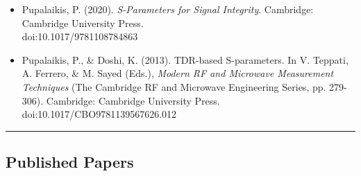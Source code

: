 \documentclass[10pt,letterpaper]{extarticle}
\newenvironment{indentsection}[1]%
{\begin{list}{}%
	{\setlength{\leftmargin}{#1}}%
	\item[]%
}
{\end{list}}
\begin{document}
\begin{indentsection}{-1em}\begin{itemize}
\parskip=-0.2em
\item Pupalaikis, P. (2020). \emph{S-Parameters for Signal Integrity}. Cambridge: Cambridge University Press.\\ doi:10.1017/9781108784863
\item Pupalaikis, P., \& Doshi, K. (2013). TDR-based S-parameters. In V. Teppati, A. Ferrero, \& M. Sayed (Eds.), \emph{Modern RF and Microwave Measurement Techniques} (The Cambridge RF and Microwave Engineering Series, pp. 279-306). Cambridge: Cambridge University Press. doi:10.1017/CBO9781139567626.012
\end{itemize}\end{indentsection}

\vspace{0.2em}
\hrule
\vspace{-1em}\subsection*{\Large Published Papers}\vspace{-0.5em}
\end{document}
